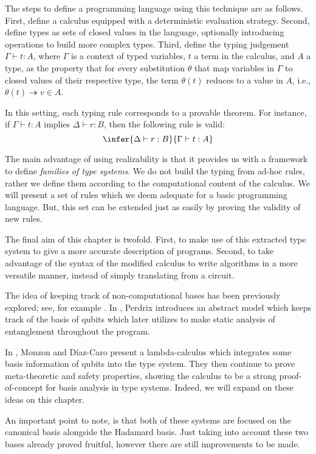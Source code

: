 The steps to define a programming language using this technique are as follows. First, define a calculus equipped with a deterministic evaluation strategy. Second, define types as sets of closed values in the language, optionally introducing operations to build more complex types. Third, define the typing judgement $\Gamma \vdash t : A$, where $\Gamma$ is a context of typed variables, $t$ a term in the calculus, and $A$ a type, as the property that for every substitution $\theta$ that map variables in $\Gamma$ to closed values of their respective type, the term $\theta(t)$ reduces to a value in $A$, i.e., $\theta(t) \twoheadrightarrow v \in A$.

In this setting, each typing rule corresponds to a provable theorem. For instance, if $\Gamma \vdash t : A$ implies $\Delta \vdash r : B$, then the following rule is valid:
\[
  \infer{\Delta\vdash r:B}{\Gamma\vdash t:A}
\]

The main advantage of using realizability is that it provides us with a framework to define \emph{families of type systems}. We do not build the typing from ad-hoc rules, rather we define them according to the computational content of the calculus. We will present a set of rules which we deem adequate for a basic programming language. But, this set can be extended just as easily by proving the validity of new rules.

The final aim of this chapter is twofold. First, to make use of this extracted type system to give a more accurate description of programs. Second, to take advantage of the syntax of the modified calculus to write algorithms in a more versatile manner, instead of simply translating from a circuit.

The idea of keeping track of non-computational bases has been previously explored; see, for example \cite{Perdrix2008,Monzon2025}. In \cite{Perdrix2008}, Perdrix introduces an abstract model which keeps track of the basis of qubits which later utilizes to make static analysis of entanglement throughout the program.

In \cite{Monzon2025}, Monzon and Díaz-Caro present a lambda-calculus which integrates some basis information of qubits into the type system. They then continue to prove meta-theoretic and safety properties, showing the calculus to be a strong proof-of-concept for basis analysis in type systems. Indeed, we will expand on these ideas on this chapter. 

An important point to note, is that both of these systems are focused on the canonical basis alongside the Hadamard basis. Just taking into account these two bases already proved fruitful, however there are still improvements to be made. 

